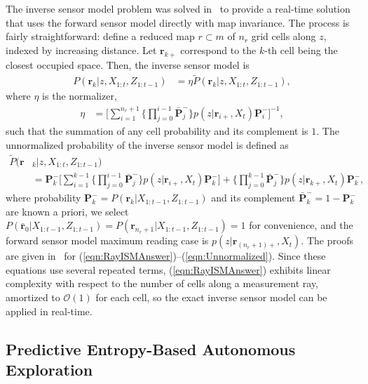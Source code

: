 \documentclass[smallextended]{svjour3}       %
\newcommand{\refeqn}[1]{(\ref{eqn:#1})}
\begin{document}
\sloppy
The inverse sensor model problem was solved in~\cite{KauLeeAiMos16,KauTakAiLee17} to provide a real-time solution that uses the forward sensor model directly with map invariance. The process is fairly straightforward: define a reduced map $r\subset m$ of $n_r$ grid cells along $z$, indexed by increasing distance. Let $\mathbf{r}_{k+}$ correspond to the $k$-th cell being the closest occupied space. Then, the inverse sensor model is
\begin{align}
\label{eqn:RayISMAnswer}
P(\mathbf{r}_{k}|z,X_{1:t},Z_{1:t-1})&=\eta\tilde P(\mathbf{r}_{k}|z,X_{1:t},Z_{1:t-1}),
\end{align}
where $\eta$ is the normalizer,
\begin{align}
\label{eqn:allEta}
\eta
&=
\bigg[\sum_{i=1}^{n_{r}+1}\bigg\{\prod_{j=0}^{i-1}\bar{\mathbf{P}}_j^-\bigg\} p(z|\mathbf{r}_{i+},X_t)\mathbf{P}_i^-\bigg]^{-1},
\end{align}
such that the summation of any cell probability and its complement is $1$. The unnormalized probability of the inverse sensor model is defined as
\begin{align}
\label{eqn:Unnormalized}
\tilde P(\mathbf{r}&_{k}|z,X_{1:t},Z_{1:t-1})\nonumber\\
&=\mathbf{P}_k^-
\bigg[\sum_{i=1}^{k-1}\bigg\{\prod_{j=0}^{i-1}\bar{\mathbf{P}}_j^-\bigg\}p(z|\mathbf{r}_{i+},X_t)\mathbf{P}_k^-\bigg]+ \bigg\{\prod_{j=0}^{k-1}\bar{\mathbf{P}}_j^-\bigg\}p(z|\mathbf{r}_{k+},X_t)\mathbf{P}_k^-,
\end{align}
where probability $\mathbf{P}_k^-=P(\mathbf{r}_{k}|X_{1:t-1},Z_{1:t-1})$ and its complement $\bar{\mathbf{P}}_k^-=1-\mathbf{P}_k^-$ are known a priori, we select $P(\bar{\mathbf{r}}_{0}|X_{1:t-1},Z_{1:t-1})=P(\mathbf{r}_{n_r+1}|X_{1:t-1},Z_{1:t-1})=1$ for convenience, and the forward sensor model maximum reading case is $p(z|\mathbf{r}_{(n_r+1)+},X_t)$. The proofs are given in~\cite{KauLeeAiMos16} for \refeqn{RayISMAnswer}--\refeqn{Unnormalized}. Since these equations use several repeated terms, \refeqn{RayISMAnswer} exhibits linear complexity with respect to the number of cells along a measurement ray, amortized to $\mathcal{O}(1)$ for each cell, so the exact inverse sensor model can be applied in real-time.

\subsection{Predictive Entropy-Based Autonomous Exploration}
\end{document}
